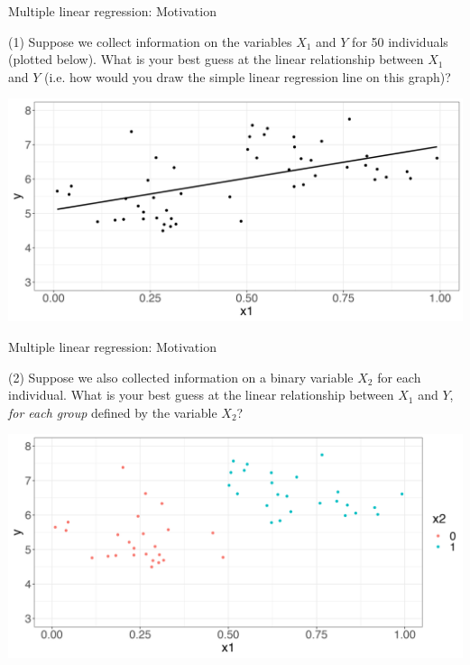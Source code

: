 \documentclass[10pt,t]{beamer}
\begin{document}
\begin{frame}{Multiple linear regression: Motivation}
	\vspace{-5 mm}
	
(1) Suppose we collect information on the variables $X_1$ and $Y$ for 50 individuals (plotted below). What is your best guess at the linear relationship between $X_1$ and $Y$ (i.e. how would you draw the simple linear regression line on this graph)?

\vspace{0.3cm}

\centering \includegraphics[scale=0.4]{figures/multreg2.png}
\end{frame}

\begin{frame}{Multiple linear regression: Motivation}
\vspace{-5 mm}

(2) Suppose we also collected information on a binary variable $X_2$ for each individual. What is your best guess at the linear relationship between $X_1$ and $Y$, \textit{for each group} defined by the variable $X_2$? 

\vspace{0.3cm}

\centering \includegraphics[scale=0.4]{figures/multreg3.png}

\end{frame}
\end{document}
